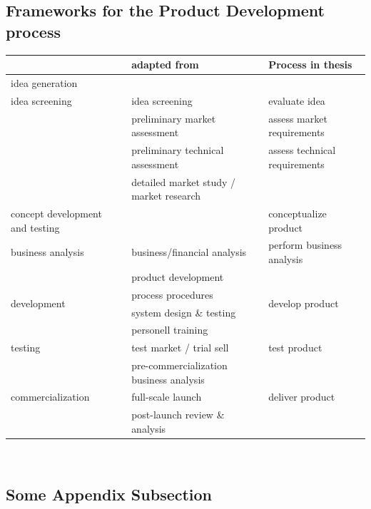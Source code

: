 \subsection{Frameworks for the Product Development process}
\label{app:pdframeworks}
\begin{table}[caption={Product Development process derivation}, label=tab:nsdframeworkds]
	\centering
\begin{tabular}{p{4cm}|p{5cm} |p{4.7cm}}
	\textbf{\cite{cowell1988new}} & \textbf{\cite{Edgett_1996}} adapted from \cite{cooper1988new}  & \textbf{Process in thesis}   \\ \hline \hline
	idea generation                 &                                         \\ \hline
	idea screening                  & idea screening   & evaluate idea                      \\ \hline
	& \textbullet \: preliminary market assessment     &assess market requirements    \\
	& \textbullet \: preliminary technical assessment  &assess technical requirements       \\
	& \textbullet \: detailed market study / market research \\ \hline
	concept development and testing &                       & conceptualize product                  \\ \hline
	business analysis               & business/financial analysis           & perform business analysis  \\ \hline
	\multirow{4}{*}{development}    & \textbullet \: product development      &	\multirow{4}{*}{develop product}               \\ 
	& \textbullet \: process procedures                      \\
	& \textbullet \: system design \& testing                \\
	& \textbullet \: personell training                      \\\hline
	testing                         & test market / trial sell       & test product         \\ \hline
	                      & pre-commercialization \:\:\:\:\:\:\:\:\:\:\:\:\:\:\:\:\:\:\: business analysis \\ \hline
	commercialization               & full-scale launch                   & deliver product    \\ \hline
	& post-launch review \& analysis         
\end{tabular}\\
\end{table}

\subsection{Some Appendix Subsection}

\lipsum[10]